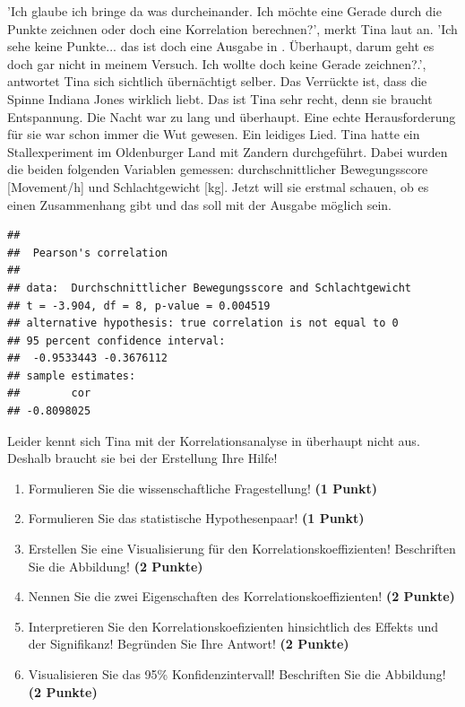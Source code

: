 \documentclass[a4paper, 9pt]{scrartcl}\usepackage[]{graphicx}\usepackage[]{xcolor}
\makeatletter
\newenvironment{kframe}{%
 \def\at@end@of@kframe{}%
 \ifinner\ifhmode%
  \def\at@end@of@kframe{\end{minipage}}%
  \begin{minipage}{\columnwidth}%
 \fi\fi%
 \def\FrameCommand##1{\hskip\@totalleftmargin \hskip-\fboxsep
 \colorbox{shadecolor}{##1}\hskip-\fboxsep
     \hskip-\linewidth \hskip-\@totalleftmargin \hskip\columnwidth}%
 \MakeFramed {\advance\hsize-\width
   \@totalleftmargin\z@ \linewidth\hsize
   \@setminipage}}%
 {\par\unskip\endMakeFramed%
 \at@end@of@kframe}
\newenvironment{knitrout}{}{} %
\makeatother
\begin{document}
'Ich glaube ich bringe da was durcheinander. Ich möchte eine Gerade durch die Punkte zeichnen oder doch eine Korrelation berechnen?', merkt Tina laut an. 'Ich sehe keine Punkte... das ist doch eine Ausgabe in \Rlogo. Überhaupt, darum geht es doch gar nicht in meinem Versuch. Ich wollte doch keine Gerade zeichnen?.', antwortet Tina sich sichtlich übernächtigt selber. Das Verrückte ist, dass die Spinne Indiana Jones wirklich liebt. Das ist Tina sehr recht, denn sie braucht Entspannung. Die Nacht war zu lang und überhaupt. Eine echte Herausforderung für sie war schon immer die Wut gewesen. Ein leidiges Lied. Tina hatte ein Stallexperiment im Oldenburger Land mit Zandern durchgeführt. Dabei wurden die beiden folgenden Variablen gemessen: durchschnittlicher Bewegungsscore [Movement/h] und Schlachtgewicht [kg]. Jetzt will sie erstmal schauen, ob es einen Zusammenhang gibt und das soll mit der \Rlogo Ausgabe möglich sein.


\begin{knitrout}
\color{fgcolor}\begin{kframe}
\begin{verbatim}
## 
## 	Pearson's correlation
## 
## data:  Durchschnittlicher Bewegungsscore and Schlachtgewicht
## t = -3.904, df = 8, p-value = 0.004519
## alternative hypothesis: true correlation is not equal to 0
## 95 percent confidence interval:
##  -0.9533443 -0.3676112
## sample estimates:
##        cor 
## -0.8098025
\end{verbatim}
\end{kframe}
\end{knitrout}

Leider kennt sich Tina mit der Korrelationsanalyse in \Rlogo überhaupt nicht aus. Deshalb braucht sie bei der Erstellung Ihre Hilfe!

\begin{enumerate}
  \item Formulieren Sie die wissenschaftliche Fragestellung! \textbf{(1 Punkt)}
  \item Formulieren Sie das statistische Hypothesenpaar! \textbf{(1 Punkt)}
\item Erstellen Sie eine Visualisierung für den Korrelationskoeffizienten! Beschriften Sie die Abbildung! \textbf{(2 Punkte)}
\item Nennen Sie die zwei Eigenschaften des Korrelationskoeffizienten! \textbf{(2 Punkte)}
\item Interpretieren Sie den Korrelationskoefizienten hinsichtlich des
  Effekts und der Signifikanz! Begründen Sie Ihre Antwort! \textbf{(2 Punkte)}
\item Visualisieren Sie das 95\% Konfidenzintervall! Beschriften Sie die Abbildung! \textbf{(2 Punkte)} 
\end{enumerate} 
\clearpage
\end{document}

